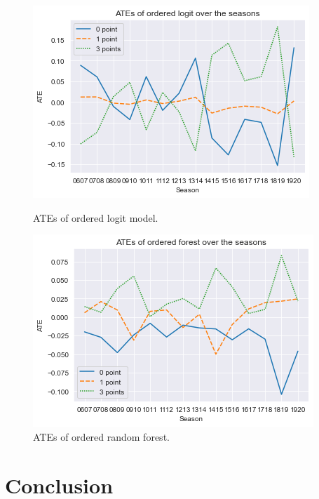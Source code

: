 \documentclass[11pt]{article}
\begin{document}
\begin{figure}[ht]
\centering
\begin{minipage}{.5\textwidth}
  \centering
  \includegraphics[width=1\linewidth]{ATEs_logit.png}
  \caption{ATEs of ordered logit model.}
  \label{fig:ATEslogit}
\end{minipage}%
\begin{minipage}{.5\textwidth}
  \centering
  \includegraphics[width=1\linewidth]{ATEs_orf.png}
  \caption{ATEs of ordered random forest.}
  \label{fig:ATEsorf}
\end{minipage}
\end{figure}


\section{Conclusion}
\end{document}
